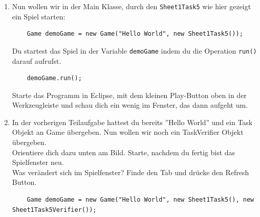 
\label{ex5}

\begin{enumerate}
    \item Nun wollen wir in der Main Klasse, durch
    den \lstinline{Sheet1Task5} wie hier gezeigt ein Spiel starten:
    
    \begin{lstlisting}
    Game demoGame = new Game("Hello World", new Sheet1Task5());
    \end{lstlisting}
    
    Du startest das Spiel in der Variable \lstinline{demoGame} indem du die Operation \lstinline{run()} darauf aufrufst.
    
    \begin{lstlisting}
    demoGame.run();
    \end{lstlisting}
    
    Starte das Programm in Eclipse, mit dem kleinen Play-Button oben in der Werkzeugleiste und schau dich ein wenig im Fenster, das dann aufgeht um.
    
    \vspace{5mm}
    
    \item In der vorherigen Teilaufgabe hattest du bereits ''Hello World'' und ein Task Objekt an Game übergeben.
    Nun wollen wir noch ein TaskVerifier Objekt übergeben.\\
    Orientiere dich dazu unten am Bild. Starte, nachdem du fertig bist das Spielfenster neu. \\
    
    Was verändert sich im Spielfenster?
    Finde den  Tab und drücke den Refresh Button.
    
    \begin{lstlisting}
    Game demoGame = new Game("Hello World", new Sheet1Task5(), new Sheet1Task5Verifier());
    \end{lstlisting}
    
    \end{enumerate}


